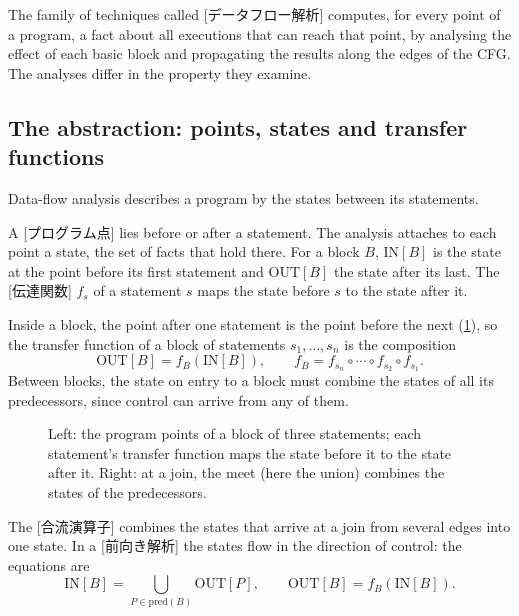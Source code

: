 \documentclass[../main.tex]{subfiles}
\begin{document}
\begin{definition}
  The family of techniques called
  [データフロー解析] computes, for every
  point of a program, a fact about all executions that can reach that
  point, by analysing the effect of each basic block and propagating
  the results along the edges of the CFG.  The analyses differ in the
  property they examine.
\end{definition}

\subsection{The abstraction: points, states and transfer functions}

Data-flow analysis describes a program by the states between its
statements.

\begin{definition}
  A [プログラム点] lies before or after a
  statement.  The analysis attaches to each point a state, the set of
  facts that hold there.  For a block $B$, $\mathrm{IN}[B]$ is the
  state at the point before its first statement and $\mathrm{OUT}[B]$
  the state after its last.  The [伝達関数]
  $f_s$ of a statement $s$ maps the state before $s$ to the state after
  it.
\end{definition}

Inside a block, the point after one statement is the point before the
next (\cref{fig:l10-transfer}), so the transfer function of a block of
statements $s_1,\dots,s_n$ is the composition
\begin{equation}
  \label{eq:l10-compose}
  \mathrm{OUT}[B] = f_B(\mathrm{IN}[B]),\qquad
  f_B = f_{s_n}\circ\cdots\circ f_{s_2}\circ f_{s_1}.
\end{equation}
Between blocks, the state on entry to a block must combine the states
of all its predecessors, since control can arrive from any of them.

\begin{figure}[tb]
  \centering
  
  \caption{Left: the program points of a block of three statements;
    each statement's transfer function maps the state before it to the
    state after it.  Right: at a join, the meet (here the union)
    combines the states of the predecessors.}
  \label{fig:l10-transfer}
\end{figure}

\begin{definition}
  The [合流演算子] combines the states that arrive
  at a join from several edges into one state.  In a
  [前向き解析] the states flow in the direction
  of control: the equations are
  \begin{equation}
    \label{eq:l10-forward}
    \mathrm{IN}[B] = \bigcup_{P\in\mathrm{pred}(B)}\mathrm{OUT}[P],\qquad
    \mathrm{OUT}[B] = f_B(\mathrm{IN}[B]).
  \end{equation}
\end{definition}
\end{document}
